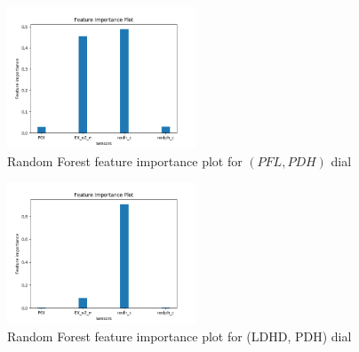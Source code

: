 \documentclass[12pt,chapterheads]{ucsd}
\begin{document}
\begin{figure}[h] 
\centering
\includegraphics[width=0.5\textwidth]{PFL_PDH_rfr_important_features}
\caption[Random Forest feature importance plot for $(PFL, PDH)$ dial]
{Random Forest feature importance plot for $(PFL, PDH)$ dial}
\label{fig:PflPdhRfrImp}
\end{figure}

\begin{figure}[h] 
\centering
\includegraphics[width=0.5\textwidth]{LDH_D_PDH_rfr_important_features}
\caption[Random Forest feature importance plot for \string(LDH\textunderscore D, PDH) dial]
{Random Forest feature importance plot for \string(LDH\textunderscore D, PDH) dial}
\label{fig:LdhPdhRfrImp}
\end{figure}
\end{document}
